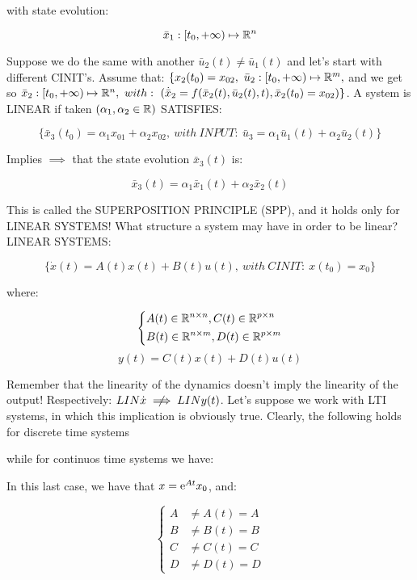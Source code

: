 with state evolution:

\[
	\bar{x}_1 : [t_0, +\infty) \mapsto \mathbb{R}^n
\]

Suppose we do the same with another $\bar{u}_2(t) \neq \bar{u}_1(t)$ and let's start with different CINIT's. Assume that: $\{x_2(t_0) = x_{02},\ \bar{u}_2 : [t_0, +\infty) \mapsto \mathbb{R}^m,$ and we get so $\bar{x}_2 : [t_0, +\infty) \mapsto \mathbb{R}^n,\ with:\ (\dot{\bar{x}}_2 = f(\bar{x}_2(t),\bar{u}_2(t),t), \bar{x}_2(t_0) = x_{02})\}$. A system is LINEAR if taken $(\alpha_1, \alpha_2 \in \mathbb{R})$ SATISFIES: 

\[
	\{\bar{x}_3(t_0) = \alpha_1x_{01} + \alpha_2x_{02},\ with\ INPUT:\ \bar{u}_3 = \alpha_1\bar{u}_1(t) + \alpha_2\bar{u}_2(t)\}
\]

Implies $\implies$ that the state evolution $\bar{x}_3(t)$ is:

\[
	\bar{x}_3(t) = \alpha_1\bar{x}_1(t) + \alpha_2\bar{x}_2(t)
\]

This is called the SUPERPOSITION PRINCIPLE (SPP), and it holds only for LINEAR SYSTEMS!
What structure a system may have in order to be linear?
LINEAR SYSTEMS:

\[
	\{ \dot{x}(t) = A(t)x(t) + B(t)u(t),\ with\ CINIT:\ x(t_0) = x_0\}
\]

where:

\[
	\left\{
	\begin{aligned}
	&A(t) \in \mathbb{R}^{n\times n}, C(t) \in \mathbb{R}^{p\times n} \\
	&B(t) \in \mathbb{R}^{n\times m}, D(t) \in \mathbb{R}^{p\times m}
	\end{aligned} 
	\right.
\]
\[
	y(t) = C(t)x(t) + D(t)u(t)
\]

Remember that the linearity of the dynamics doesn't imply the linearity of the output! Respectively: $LIN \dot{x} \centernot\implies LIN y(t)$.
Let's suppose we work with LTI systems, in which this implication is obviously true. Clearly, the following holds for discrete time systems

\ldtsys

while for continuos time systems we have:

\lctsys

In this last case, we have that $x = \mathop{}\!\mathrm{e}^{At}x_0$, and:
 
\[
 	\left\{
	\begin{aligned}
	A &\neq A(t) = A \\
	B &\neq B(t) = B \\
	C &\neq C(t) = C \\
	D &\neq D(t) = D
	\end{aligned} 
	\right.
\]

